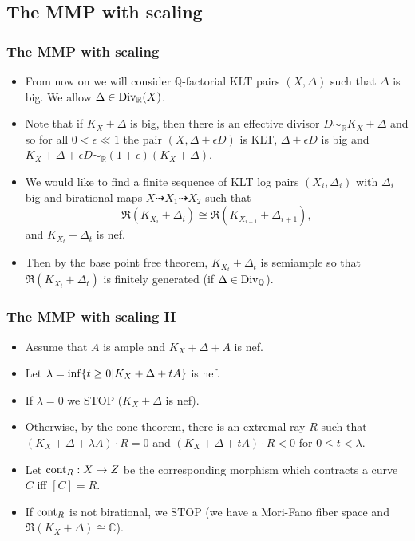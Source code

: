\documentclass{beamer}
\theoremstyle{plain}
\theoremstyle{definition}
\theoremstyle{remark}
\def\Q{\mathbb {Q}}
\begin{document}
\begin{frame}
\subsection{The MMP with scaling}
\frametitle{The MMP with scaling}
\begin{itemize}\item From now on we will consider 
$\Q$-factorial KLT pairs $(X,\Delta )$ 
such that $\Delta$ is big. We allow $\Delta \in {\rm Div }_{\mathbb {R}}(X)$.
\item Note that if $K_X+\Delta$ is big, then there is an effective divisor
$D\sim _{\mathbb {R}}K_X+\Delta$ and so for all $0<\epsilon \ll 1$
the pair $(X,\Delta+\epsilon D)$ is KLT, $\Delta+\epsilon D$ is big  
and $K_X+\Delta+\epsilon D\sim _{\mathbb {R}}(1+\epsilon)(K_X+\Delta)$.
\item We would like to find a finite sequence of KLT 
log pairs $(X_i,\Delta _i)$ with $\Delta _i$ big 
and birational maps
$X\dasharrow X_{1}\dasharrow X_{2}$ such that $$\mathfrak {R}(K_{X_i}+\Delta _i
)\cong \mathfrak {R}(K_{X_{i+1}}+\Delta _{i+1}),$$
and $K_{X_t}+\Delta _t$ is nef.
\item Then by the base point free theorem, $K_{X_t}+\Delta _t$ is
semiample so that $\mathfrak {R}(K_{X_t}+\Delta _t)$ is finitely generated (if $\Delta \in {\rm Div}_\Q$).
\end{itemize}

\end{frame}
\begin{frame}
 \frametitle{The MMP with scaling II}
\begin{itemize}
\item Assume that $A$ is ample and $K_X+\Delta+A$ is nef. 
\item Let $\lambda ={\rm inf}\{t\geq 0|K_X+\Delta +tA\}$ is nef.
\item If $\lambda =0$ we STOP ($K_X+\Delta$ is nef). 
\item Otherwise, by the cone theorem,
there is an extremal ray $R$ such that $(K_X+\Delta +\lambda A)\cdot R=0$ and $(K_X+\Delta +tA)\cdot R<0$
for $0\leq t<\lambda$.
\item Let ${\rm cont}_R:X\to Z$ be the corresponding morphism which contracts 
a curve $C$ iff $[C]=R$.
\item If ${\rm cont}_R$ is not birational, we STOP (we
have a Mori-Fano fiber space and $\mathfrak {R}(K_X+\Delta)\cong \mathbb{C}$).
\end{itemize}
\end{frame}
\end{document}
